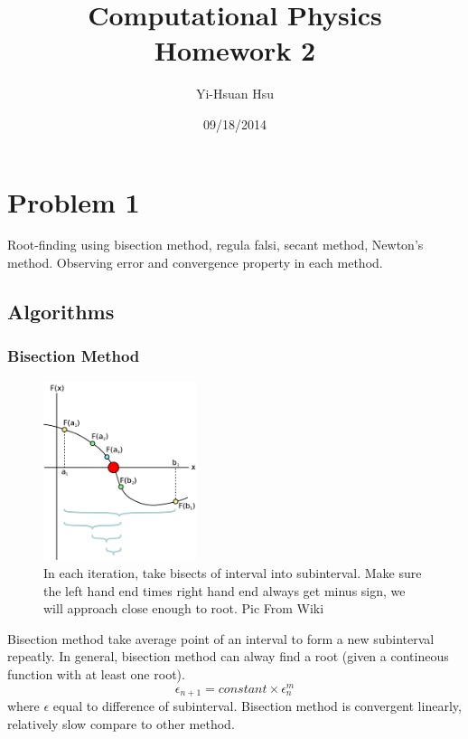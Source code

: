\documentclass[12pt]{article}
\begin{document}
\title{Computational Physics \\ Homework 2}
\author{Yi-Hsuan Hsu}
\date{09/18/2014}
\maketitle

\section{Problem 1}

Root-finding using bisection method, regula falsi, secant method, Newton's method. Observing error and convergence property in each method.

\subsection{Algorithms}

\subsubsection{Bisection Method}
\begin{figure}
	\begin{center}
		\includegraphics[width=0.4\textwidth]{bisection.png}
		\caption{In each iteration, take bisects of interval into subinterval. Make sure the left hand end times right hand end always get minus sign, we will approach close enough to root. Pic From Wiki}
		\label{fig1}
		
	\end{center}
\end{figure}

Bisection method take average point of an interval to form a new subinterval repeatly. In general, bisection method can alway find a root (given a contineous function with at least one root).
\begin{equation}
\epsilon_{n+1}=constant\times\epsilon_{n}^{m}
\end{equation}
where $\epsilon$ equal to difference of subinterval. Bisection method is convergent linearly, relatively slow compare to other method. 
\end{document}
